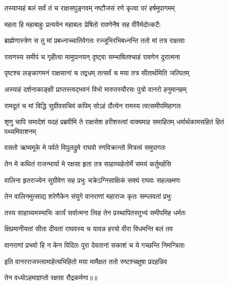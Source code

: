 \twolineshloka
{तस्याप्यहं बलं सर्वं तं च राक्षसपुङ्गवम्}
{नष्टौजसं रणे कृत्वा परं हर्षमुपागमम्} %

\twolineshloka
{महता हि महाबाहुः प्रत्ययेन महाबलः}
{प्रेषितो रावणेनैष सह वीरैर्मदोत्कटैः} %

\twolineshloka
{ब्राह्मेणास्त्रेण स तु मां प्रबध्नाच्चातिवेगतः}
{रज्जूभिरभिबध्नन्ति ततो मां तत्र राक्षसाः} %

\twolineshloka
{रावणस्य समीपं च गृहीत्वा मामुपानयन्}
{दृष्ट्वा सम्भाषितश्चाहं रावणेन दुरात्मना} %

\twolineshloka
{पृष्टश्च लङ्कागमनं राक्षसानां च तद्वधम्}
{तत्सर्वं च मया तत्र सीतार्थमिति जल्पितम्} %

\twolineshloka
{अस्याहं दर्शनाकाङ्क्षी प्राप्तस्त्वद्भवनं विभो}
{मारुतस्यौरसः पुत्रो वानरो हनुमानहम्} %

\twolineshloka
{रामदूतं च मां विद्धि सुग्रीवसचिवं कपिम्}
{सोऽहं दौत्येन रामस्य त्वत्समीपमिहागतः} %

\threelineshloka
{शृणु चापि समादेशं यदहं प्रब्रवीमि ते}
{राक्षसेश हरीशस्त्वां वाक्यमाह समाहितम्}
{धर्मार्थकामसहितं हितं पथ्यमिवाशनम्} %

\twolineshloka
{वसतो ऋष्यमूके मे पर्वते विपुलद्रुमे}
{राघवो रणविक्रान्तो मित्रत्वं समुपागतः} %

\twolineshloka
{तेन मे कथितं राजन्भार्या मे रक्षसा हृता}
{तत्र साहाय्यहेतोर्मे समयं कर्तुमर्हसि} %

\twolineshloka
{वालिना हृतराज्येन सुग्रीवेण सह प्रभुः}
{चक्रेऽग्निसाक्षिकं सक्यं राघवः सहलक्ष्मणः} %

\twolineshloka
{तेन वालिनमुत्साद्य शरेणैकेन संयुगे}
{वानराणां महाराजः कृतः सम्प्लवतां प्रभुः} %

\twolineshloka
{तस्य साहाय्यमस्माभिः कार्यं सर्वात्मना त्विह}
{तेन प्रस्थापितस्तुभ्यं समीपमिह धर्मतः} %

\twolineshloka
{क्षिप्रमानीयतां सीता दीयतां राघवस्य च}
{यावन्न हरयो वीरा विधमन्ति बलं तव} %

\twolineshloka
{वानराणां प्रभवो हि न केन विदितः पुरा}
{देवतानां सकाशं च ये गच्छन्ति निमन्त्रिताः} %

\twolineshloka
{इति वानरराजस्त्वामाहेत्यभिहितो मया}
{मामैक्षत ततो रुष्टश्चक्षुषा प्रदहन्निव} %

{तेन वध्योऽहमाज्ञप्तो रक्षसा रौद्रकर्मणा॥॥} %

\addtocounter{shlokacount}{1}

